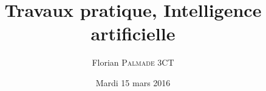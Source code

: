 


\title{Travaux pratique, Intelligence artificielle}
\date{Mardi 15 mars 2016}
\author{Florian \textsc{Palmade} 3CT}



\maketitle
\thispagestyle{fancy} 












